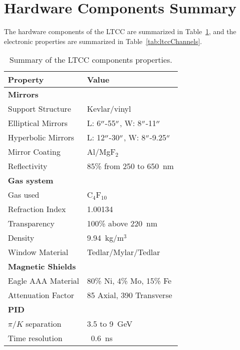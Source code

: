 \section{Hardware Components Summary}

The hardware components of the LTCC are summarized in Table~\ref{tab:ltccProperties}, and the electronic properties
are summarized in Table~\ref{tab:ltccChannels}.

\begin{table}[h]
	\begin{center}
		\begin{tabular}{| l | l |}
			\hline \hline
			Property                 & Value \\
			\hline
			{\bf Mirrors}            &                               \\
			Support Structure        & Kevlar/vinyl                  \\
			Elliptical Mirrors       & L: 6$^{\prime\prime}$-55$^{\prime\prime}$,  W: 8$^{\prime\prime}$-11$^{\prime\prime}$     \\
			Hyperbolic Mirrors       & L: 12$^{\prime\prime}$-30$^{\prime\prime}$, W: 8$^{\prime\prime}$-9.25$^{\prime\prime}$   \\
			Mirror Coating           & Al/MgF$_2$                    \\
			Reflectivity             & 85\% from 250 to 650~nm       \\
			{\bf Gas system}         &                               \\
			Gas used                 &   C$_4$F$_{10}$                 \\
			Refraction Index         & 1.00134                       \\
			Transparency             & 100\% above 220~nm            \\
			Density                  & 9.94~kg/m$^3$                 \\
			Window Material          & Tedlar/Mylar/Tedlar           \\
			{\bf Magnetic Shields}   &                               \\
			Eagle AAA Material       & 80\% Ni, 4\% Mo, 15\% Fe      \\
			Attenuation Factor       &  85 Axial, 390 Transverse     \\
			{\bf PID}                &                               \\
			$\pi/K$ separation       &  3.5 to 9~GeV               \\
			Time resolution          &  ~0.6~ns                      \\
			\hline \hline
		\end{tabular}
	\end{center}
        \caption{Summary of the LTCC components properties.}
        \label{tab:ltccProperties}
\end{table}

